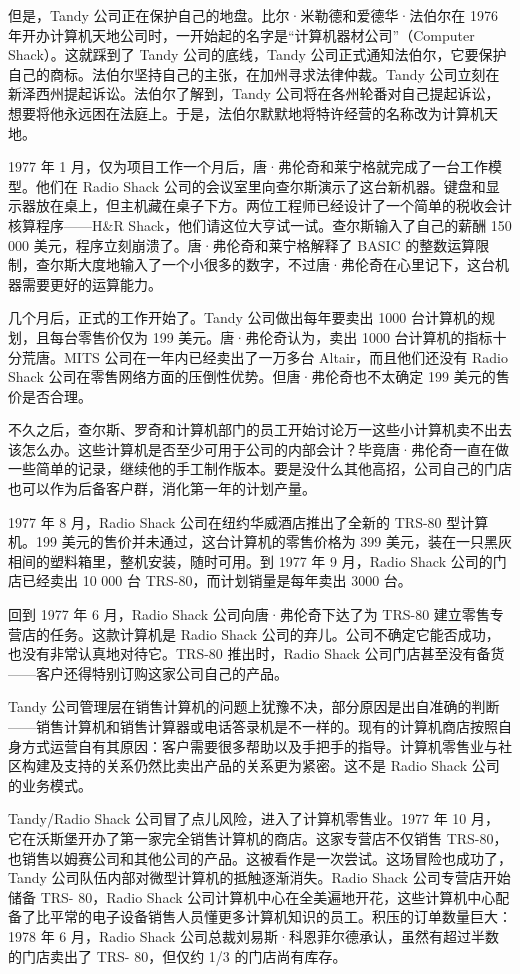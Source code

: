\documentclass[12pt,UTF8]{ctexbook}
\begin{document}
但是，Tandy 公司正在保护自己的地盘。比尔·米勒德和爱德华·法伯尔在 1976 年开办计算机天地公司时，一开始起的名字是“计算机器材公司”（Computer Shack）。这就踩到了 Tandy 公司的底线，Tandy 公司正式通知法伯尔，它要保护自己的商标。法伯尔坚持自己的主张，在加州寻求法律仲裁。Tandy 公司立刻在新泽西州提起诉讼。法伯尔了解到，Tandy 公司将在各州轮番对自己提起诉讼，想要将他永远困在法庭上。于是，法伯尔默默地将特许经营的名称改为计算机天地。

1977 年 1 月，仅为项目工作一个月后，唐·弗伦奇和莱宁格就完成了一台工作模型。他们在 Radio Shack 公司的会议室里向查尔斯演示了这台新机器。键盘和显示器放在桌上，但主机藏在桌子下方。两位工程师已经设计了一个简单的税收会计核算程序——H\&R Shack，他们请这位大亨试一试。查尔斯输入了自己的薪酬 150 000 美元，程序立刻崩溃了。唐·弗伦奇和莱宁格解释了 BASIC 的整数运算限制，查尔斯大度地输入了一个小很多的数字，不过唐·弗伦奇在心里记下，这台机器需要更好的运算能力。

几个月后，正式的工作开始了。Tandy 公司做出每年要卖出 1000 台计算机的规划，且每台零售价仅为 199 美元。唐·弗伦奇认为，卖出 1000 台计算机的指标十分荒唐。MITS 公司在一年内已经卖出了一万多台 Altair，而且他们还没有 Radio Shack 公司在零售网络方面的压倒性优势。但唐·弗伦奇也不太确定 199 美元的售价是否合理。

不久之后，查尔斯、罗奇和计算机部门的员工开始讨论万一这些小计算机卖不出去该怎么办。这些计算机是否至少可用于公司的内部会计？毕竟唐·弗伦奇一直在做一些简单的记录，继续他的手工制作版本。要是没什么其他高招，公司自己的门店也可以作为后备客户群，消化第一年的计划产量。

1977 年 8 月，Radio Shack 公司在纽约华威酒店推出了全新的 TRS-80 型计算机。199 美元的售价并未通过，这台计算机的零售价格为 399 美元，装在一只黑灰相间的塑料箱里，整机安装，随时可用。到 1977 年 9 月，Radio Shack 公司的门店已经卖出 10 000 台 TRS-80，而计划销量是每年卖出 3000 台。

回到 1977 年 6 月，Radio Shack 公司向唐·弗伦奇下达了为 TRS-80 建立零售专营店的任务。这款计算机是 Radio Shack 公司的弃儿。公司不确定它能否成功，也没有非常认真地对待它。TRS-80 推出时，Radio Shack 公司门店甚至没有备货——客户还得特别订购这家公司自己的产品。

Tandy 公司管理层在销售计算机的问题上犹豫不决，部分原因是出自准确的判断——销售计算机和销售计算器或电话答录机是不一样的。现有的计算机商店按照自身方式运营自有其原因：客户需要很多帮助以及手把手的指导。计算机零售业与社区构建及支持的关系仍然比卖出产品的关系更为紧密。这不是 Radio Shack 公司的业务模式。

Tandy/Radio Shack 公司冒了点儿风险，进入了计算机零售业。1977 年 10 月，它在沃斯堡开办了第一家完全销售计算机的商店。这家专营店不仅销售 TRS-80，也销售以姆赛公司和其他公司的产品。这被看作是一次尝试。这场冒险也成功了，Tandy 公司队伍内部对微型计算机的抵触逐渐消失。Radio Shack 公司专营店开始储备 TRS- 80，Radio Shack 公司计算机中心在全美遍地开花，这些计算机中心配备了比平常的电子设备销售人员懂更多计算机知识的员工。积压的订单数量巨大：1978 年 6 月，Radio Shack 公司总裁刘易斯·科恩菲尔德承认，虽然有超过半数的门店卖出了 TRS- 80，但仅约 1/3 的门店尚有库存。
\end{document}

